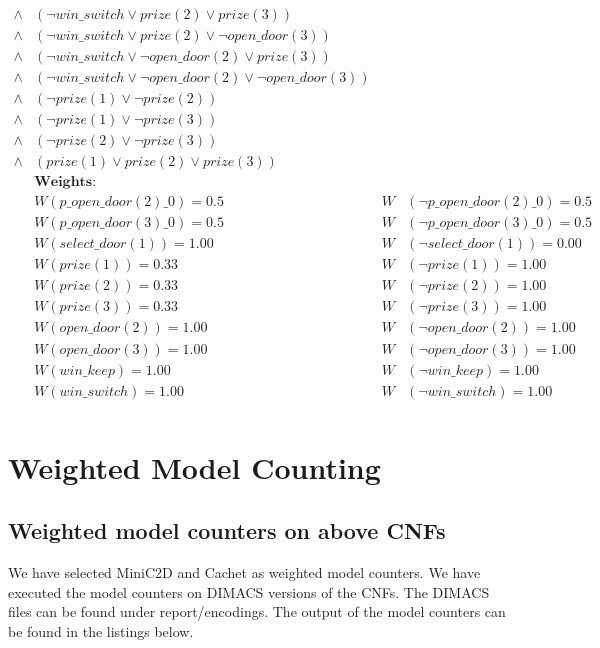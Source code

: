 \begin{align*}
    \land & (\neg win\_switch \lor prize(2) \lor prize(3))                            \\
    \land & (\neg win\_switch \lor prize(2) \lor \neg open\_door(3))                  \\
    \land & (\neg win\_switch \lor \neg open\_door(2) \lor prize(3))                  \\
    \land & (\neg win\_switch \lor \neg open\_door(2) \lor \neg open\_door(3))        \\
    \land & (\neg prize(1) \lor \neg prize(2))                                        \\
    \land & (\neg prize(1) \lor \neg prize(3))                                        \\
    \land & (\neg prize(2) \lor \neg prize(3))                                        \\
    \land & (prize(1) \lor prize(2) \lor prize(3))\\
    & \textbf{Weights:}             \\
    & W(p\_open\_door(2)\_0) = 0.5 & W &(\neg p\_open\_door(2)\_0) = 0.5 \\
    & W(p\_open\_door(3)\_0) = 0.5 & W &(\neg p\_open\_door(3)\_0) = 0.5 \\
    & W(select\_door(1)) = 1.00    & W &(\neg select\_door(1)) = 0.00    \\
    & W(prize(1)) = 0.33           & W &(\neg prize(1)) = 1.00           \\
    & W(prize(2)) = 0.33           & W &(\neg prize(2)) = 1.00           \\
    & W(prize(3)) = 0.33           & W &(\neg prize(3)) = 1.00           \\
    & W(open\_door(2)) = 1.00      & W &(\neg open\_door(2)) = 1.00      \\
    & W(open\_door(3)) = 1.00      & W &(\neg open\_door(3)) = 1.00      \\
    & W(win\_keep) = 1.00          & W &(\neg win\_keep) = 1.00          \\
    & W(win\_switch) = 1.00        & W &(\neg win\_switch) = 1.00        \\
\end{align*}


\section{Weighted Model Counting}
\subsection{Weighted model counters on above CNFs}
We have selected MiniC2D and Cachet as weighted model counters.
We have executed the model counters on DIMACS versions of the CNFs. The DIMACS files can be found under report/encodings.
The output of the model counters can be found in the listings below.

